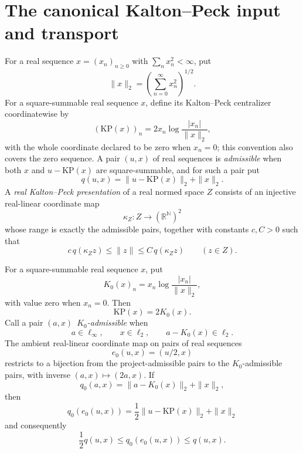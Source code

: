 \section{The canonical Kalton--Peck input and transport}

\begin{definition}\label{def:kp-presentation}
For a real sequence $x=(x_n)_{n\geq0}$ with $\sum_n x_n^2<\infty$, put
\[
  \|x\|_2=\left(\sum_{n=0}^{\infty}x_n^2\right)^{1/2}.
\]
For a square-summable real sequence $x$, define its Kalton--Peck centralizer coordinatewise by
\[
  (\mathrm{KP}(x))_n=2x_n\log\frac{|x_n|}{\|x\|_2},
\]
with the whole coordinate declared to be zero when $x_n=0$; this convention also covers the zero
sequence.  A pair $(u,x)$ of real sequences is \emph{admissible} when both $x$ and
$u-\mathrm{KP}(x)$ are square-summable, and for such a pair put
\[
  q(u,x)=\|u-\mathrm{KP}(x)\|_2+\|x\|_2.
\]
A \emph{real Kalton--Peck presentation} of a real normed space $Z$ consists of an injective
real-linear coordinate map
\[
  \kappa_Z:Z\longrightarrow(\mathbb R^{\mathbb N})^2
\]
whose range is exactly the admissible pairs, together with constants $c,C>0$ such that
\[
  c\,q(\kappa_Zz)\leq\|z\|\leq C\,q(\kappa_Zz)
  \qquad(z\in Z).
\]
\leanok
\end{definition}

\begin{lemma}
\label{lem:kp-normalization}
For a square-summable real sequence $x$, put
\[
  K_0(x)_n=x_n\log\frac{|x_n|}{\|x\|_2},
\]
with value zero when $x_n=0$.  Then
\[
  \mathrm{KP}(x)=2K_0(x).
\]
Call a pair $(a,x)$ \,\emph{$K_0$-admissible} when
\[
  a\in\ell_\infty,\qquad x\in\ell_2,
  \qquad a-K_0(x)\in\ell_2.
\]
The ambient real-linear coordinate map on pairs of real sequences
\[
  e_0(u,x)=(u/2,x)
\]
restricts to a bijection from the project-admissible pairs to the $K_0$-admissible pairs, with
inverse $(a,x)\mapsto(2a,x)$.  If
\[
  q_0(a,x)=\|a-K_0(x)\|_2+\|x\|_2,
\]
then
\[
  q_0(e_0(u,x))
   =\frac12\|u-\mathrm{KP}(x)\|_2+\|x\|_2
\]
and consequently
\[
  \frac12q(u,x)\leq q_0(e_0(u,x))\leq q(u,x).
\]
\leanok
\end{lemma}

